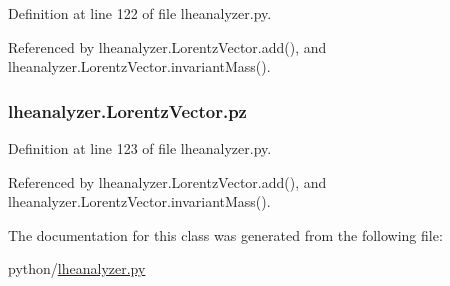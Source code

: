 Definition at line 122 of file lheanalyzer.\-py.



Referenced by lheanalyzer.\-Lorentz\-Vector.\-add(), and lheanalyzer.\-Lorentz\-Vector.\-invariant\-Mass().

\subsubsection[{pz}]{\setlength{\rightskip}{0pt plus 5cm}lheanalyzer.\-Lorentz\-Vector.\-pz}\label{classlheanalyzer_1_1LorentzVector_ab5f38fd6544fadb69158b7e7e8f96505}


Definition at line 123 of file lheanalyzer.\-py.



Referenced by lheanalyzer.\-Lorentz\-Vector.\-add(), and lheanalyzer.\-Lorentz\-Vector.\-invariant\-Mass().



The documentation for this class was generated from the following file\-:\begin{DoxyCompactItemize}
\item 
python/\hyperlink{lheanalyzer_8py}{lheanalyzer.\-py}\end{DoxyCompactItemize}

